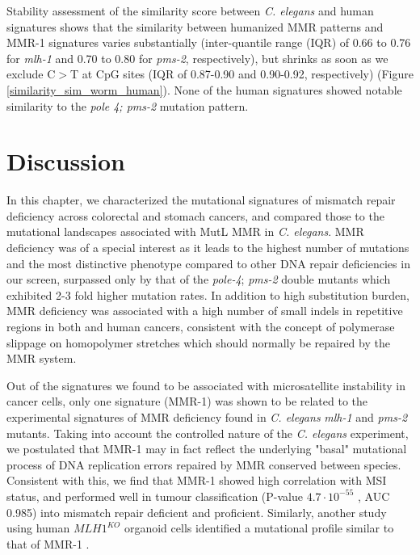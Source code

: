 Stability assessment of the similarity score between \textit{C. elegans} and human signatures shows that 
the similarity between humanized MMR patterns and MMR-1 signatures varies substantially 
(inter-quantile range (IQR) of 0.66 to 0.76 for \textit{mlh-1} and 0.70 to 0.80 for \textit{pms-2}, respectively), 
but shrinks as soon as we exclude C$>$T at CpG sites (IQR of 0.87-0.90 and 0.90-0.92, respectively) 
(Figure \ref{similarity_sim_worm_human}).
None of the human signatures showed notable 
similarity to the \textit{pole 4; pms-2} mutation pattern.


\section{Discussion}

In this chapter, we characterized the mutational signatures of mismatch repair deficiency across colorectal and stomach cancers, and compared those to the mutational landscapes associated with MutL MMR in \textit{C. elegans}. MMR deficiency was of a special interest as it leads to the highest number of mutations and the most distinctive phenotype compared to other DNA repair deficiencies in our screen, surpassed only by that of the \textit{pole-4}; \textit{pms-2} double mutants which exhibited 2-3 fold higher mutation rates. In addition to high substitution burden, MMR deficiency was associated with a high number of small indels in repetitive regions in both  and human cancers, consistent with the concept of polymerase slippage on homopolymer stretches which should normally be repaired by the MMR system. 

Out of the signatures we found to be associated with microsatellite instability in cancer cells, only one signature (MMR-1) was shown to be related to the experimental signatures of MMR deficiency found in \textit{C. elegans} \textit{mlh-1} and \textit{pms-2} mutants. Taking into account the controlled nature of the \textit{C. elegans} experiment, we postulated that MMR-1 may in fact reflect the underlying "basal" mutational process of DNA replication errors repaired by MMR conserved between species. Consistent with this, we find that MMR-1 showed high correlation with  MSI status, and performed well in tumour classification (P-value $4.7 \cdot 10^{-55}$ , AUC 0.985) into mismatch repair deficient and proficient. Similarly, another study using human $MLH1^{KO}$ organoid cells identified a mutational profile similar to that of MMR-1 \cite{Drost2017-dl}.

